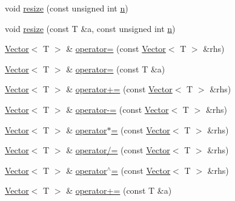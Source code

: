\begin{DoxyCompactItemize}
\item 
void \mbox{\hyperlink{classVector_ae751d4bf4c403e4578a9df1202e93f56_ae751d4bf4c403e4578a9df1202e93f56}{resize}} (const unsigned int \mbox{\hyperlink{classVector_adab11fd27ce9e960aa8612937e453786_adab11fd27ce9e960aa8612937e453786}{n}})
\item 
void \mbox{\hyperlink{classVector_a1ff5ed0bca47854450eb78024c6f52ff_a1ff5ed0bca47854450eb78024c6f52ff}{resize}} (const T \&a, const unsigned int \mbox{\hyperlink{classVector_adab11fd27ce9e960aa8612937e453786_adab11fd27ce9e960aa8612937e453786}{n}})
\item 
\mbox{\hyperlink{classVector}{Vector}}$<$ T $>$ \& \mbox{\hyperlink{classVector_aa44e8e04a723f2c0bd9382a3bfa46e7c_aa44e8e04a723f2c0bd9382a3bfa46e7c}{operator=}} (const \mbox{\hyperlink{classVector}{Vector}}$<$ T $>$ \&rhs)
\item 
\mbox{\hyperlink{classVector}{Vector}}$<$ T $>$ \& \mbox{\hyperlink{classVector_a6bbf5f187006ef2567fdcebd37ebfa97_a6bbf5f187006ef2567fdcebd37ebfa97}{operator=}} (const T \&a)
\item 
\mbox{\hyperlink{classVector}{Vector}}$<$ T $>$ \& \mbox{\hyperlink{classVector_a0cdad8a65e9dd1ef60afaf32aa547f9e_a0cdad8a65e9dd1ef60afaf32aa547f9e}{operator+=}} (const \mbox{\hyperlink{classVector}{Vector}}$<$ T $>$ \&rhs)
\item 
\mbox{\hyperlink{classVector}{Vector}}$<$ T $>$ \& \mbox{\hyperlink{classVector_ab5ed11e19503bbc0ee10c7a8d1ee2978_ab5ed11e19503bbc0ee10c7a8d1ee2978}{operator-\/=}} (const \mbox{\hyperlink{classVector}{Vector}}$<$ T $>$ \&rhs)
\item 
\mbox{\hyperlink{classVector}{Vector}}$<$ T $>$ \& \mbox{\hyperlink{classVector_a3b3e94a4ee6601a8c3ceaed790c2d965_a3b3e94a4ee6601a8c3ceaed790c2d965}{operator$\ast$=}} (const \mbox{\hyperlink{classVector}{Vector}}$<$ T $>$ \&rhs)
\item 
\mbox{\hyperlink{classVector}{Vector}}$<$ T $>$ \& \mbox{\hyperlink{classVector_adbf519ce5d68eb131947137e30596dc1_adbf519ce5d68eb131947137e30596dc1}{operator/=}} (const \mbox{\hyperlink{classVector}{Vector}}$<$ T $>$ \&rhs)
\item 
\mbox{\hyperlink{classVector}{Vector}}$<$ T $>$ \& \mbox{\hyperlink{classVector_acd4d558272832a19d614468400ca605d_acd4d558272832a19d614468400ca605d}{operator$^\wedge$=}} (const \mbox{\hyperlink{classVector}{Vector}}$<$ T $>$ \&rhs)
\item 
\mbox{\hyperlink{classVector}{Vector}}$<$ T $>$ \& \mbox{\hyperlink{classVector_a5650df0775f0677f76259cd3f474dded_a5650df0775f0677f76259cd3f474dded}{operator+=}} (const T \&a)

\end{DoxyCompactItemize}
